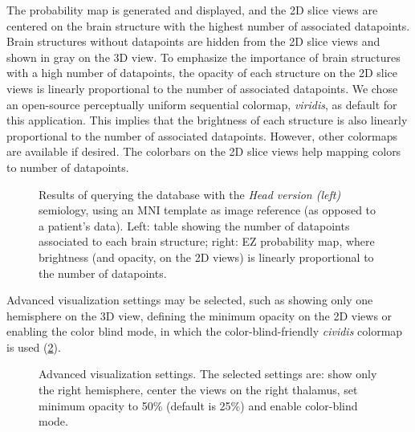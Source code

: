 The probability map is generated and displayed, and the 2D slice views are centered on the brain structure with the highest number of associated datapoints.
Brain structures without datapoints are hidden from the 2D slice views and shown in gray on the 3D view.
To emphasize the importance of brain structures with a high number of datapoints, the opacity of each structure on the 2D slice views is linearly proportional to the number of associated datapoints.
We chose an open-source perceptually uniform sequential colormap, \textit{viridis}, as default for this application.
This implies that the brightness of each structure is also linearly proportional to the number of associated datapoints.
However, other colormaps are available if desired.
The colorbars on the 2D slice views help mapping colors to number of datapoints.

\begin{figure}
  \centering
  \caption[Results of querying the database with the \textit{Head version (left)} semiology]{
    Results of querying the database with the \textit{Head version (left)} semiology, using an \ac{MNI} template as image reference (as opposed to a patient's data).
    Left: table showing the number of datapoints associated to each brain structure;
    right: \ac{EZ} probability map, where brightness (and opacity, on the 2D views) is linearly proportional to the number of datapoints.
  }
  \label{fig:svt_query}
\end{figure}


Advanced visualization settings may be selected, such as
showing only one hemisphere on the 3D view,
defining the minimum opacity on the 2D views or
enabling the color blind mode, in which the color-blind-friendly \textit{cividis} colormap is used \cite{nunez_optimizing_2018} (\cref{fig:svt_advanced}).

\begin{figure}
  \centering
  \caption[Advanced visualization settings]{
    Advanced visualization settings.
    The selected settings are:
    show only the right hemisphere,
    center the views on the right thalamus,
    set minimum opacity to 50\% (default is 25\%)
    and enable color-blind mode.
  }
  \label{fig:svt_advanced}
\end{figure}
